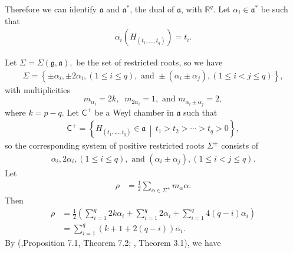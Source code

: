 \documentclass[11pt,a4paper]{amsart}
\theoremstyle{definition}
\numberwithin{equation}{section}
\begin{document}
Therefore we can identify $ \mathfrak{a}$ and $ \mathfrak{a}^*$, the dual of $\mathfrak{a}$,  with $ \mathbb{R}^q$.  Let $\alpha_i \in \mathfrak{a}^*$ 
be such that \begin{align*}
 \alpha_i\left(H_{(t_1, \dots , t_q)}\right)= t_i.
\end{align*}

Let $\Sigma=\Sigma(\mathfrak{g},\mathfrak{a}),$ be the set of restricted roots, so we have 
\begin{align*}
\Sigma= \left\{ \pm\alpha_i,   \pm 2\alpha_{i}, (1\leq i\leq q), \text{ and } \pm\left( \alpha_{i}\pm\alpha_{j}\right) , ( 1 \leq i< j \leq  q)\right\},
\end{align*}
  with multiplicities
\[
m_{\alpha_i}=2k,\;\; m_{2\alpha_i}= 1, \text{ and } m_{\alpha_i \pm \alpha_j}=2,
\]  where $k=p-q$. Let $\mathsf{C}^+$ be a  Weyl chamber in $\mathfrak{a}$ such that    
\begin{align*}
\mathsf{C}^+ = \left\{ H_{(t_1, \dots, t_q)} \in \mathfrak{a} \,\middle|\, t_1 > t_2 > \cdots > t_q > 0 \right\},
\end{align*} so   the corresponding system of
positive restricted roots $\Sigma^+$ consists of \begin{align*}
 \alpha_i,    2\alpha_{i}, (1\leq i\leq q), \text{ and } \left( \alpha_{i}\pm\alpha_{j}\right) , ( 1 \leq i< j \leq  q). 
\end{align*} 
Let \begin{align*}
\rho &= \frac{1}{2} \sum_{\alpha \in \Sigma^+} m_\alpha \alpha.
\end{align*} 
 Then \begin{align*}
\rho &=  \frac{1}{2}\left( \sum_{i=1}^q 2k\alpha_i + \sum_{i=1}^q 2\alpha_i + \sum_{i=1}^q 4 (q-i) \alpha_i    \right)\\&= \sum_{i=1}^q (k + 1 + 2 (q-i)) \alpha_i  .
\end{align*} 
By (\cite{Schlichtkrull},Proposition 7.1, Theorem 7.2; \cite{Ho-Olafsson}, Theorem 3.1), we have 
\end{document}
